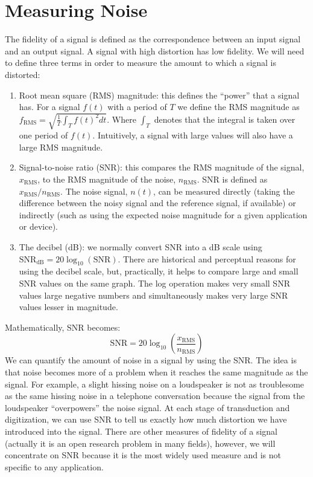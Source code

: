 \section{Measuring Noise}
The fidelity of a signal is defined as the correspondence between an
input signal and an output signal. A signal with high distortion has
low fidelity. We will need to define three terms in order to measure
the amount to which a signal is distorted:
\begin{enumerate}
\item Root mean square (RMS) magnitude: this defines the ``power''
  that a signal has. For a signal $f(t)$ with a period of $T$ we
  define the RMS magnitude as
  $f_\mathrm{RMS}=\sqrt{\frac{1}{T}\int_{T}f(t)^2 dt}$. Where $\int_T$
  denotes that the integral is taken over one period of
  $f(t)$. Intuitively, a signal with large values will also have a
  large RMS magnitude.
\item Signal-to-noise ratio (SNR): this compares the RMS magnitude of
  the signal, $x_\mathrm{RMS}$, to the RMS magnitude of the noise,
  $n_\mathrm{RMS}$. SNR is defined as
  $x_\mathrm{RMS}/n_\mathrm{RMS}$. The noise signal, $n(t)$, can be
  measured directly (taking the difference between the noisy signal
  and the reference signal, if available) or indirectly (such as using
  the expected noise magnitude for a given application or device).
\item The decibel (dB): we normally convert SNR into a dB scale using
  $\text{SNR}_\mathrm{dB}=20\log_{10}(\text{SNR})$. There are
  historical and perceptual reasons for using the decibel scale, but,
  practically, it helps to compare large and small SNR values on the
  same graph. The log operation makes very small SNR values large
  negative numbers and simultaneously makes very large SNR values
  lesser in magnitude.
\end{enumerate}
Mathematically, SNR becomes:
\begin{equation}
\text{SNR}=20\log_{10}\left(\frac{x_\mathrm{RMS}}{n_\mathrm{RMS}}\right) \label{eq:SNR}
\end{equation}
We can quantify the amount of noise in a signal by using the SNR. The
idea is that noise becomes more of a problem when it reaches the same
magnitude as the signal. For example, a slight hissing noise on a
loudspeaker is not as troublesome as the same hissing noise in a
telephone conversation because the signal from the loudspeaker
``overpowers'' the noise signal. At each stage of transduction and
digitization, we can use SNR to tell us exactly how much distortion we
have introduced into the signal. There are other measures of fidelity
of a signal (actually it is an open research problem in many fields),
however, we will concentrate on SNR because it is the most widely used
measure and is not specific to any application.

